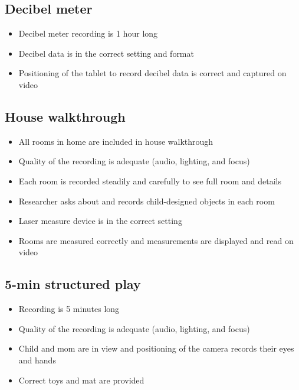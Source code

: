 \documentclass[
  12pt,
]{book}
\providecommand{\tightlist}{%
  \setlength{\itemsep}{0pt}\setlength{\parskip}{0pt}}
\begin{document}
\hypertarget{decibel-meter-1}{%
\subsection{Decibel meter}\label{decibel-meter-1}}

\begin{itemize}
\tightlist
\item
  Decibel meter recording is 1 hour long
\item
  Decibel data is in the correct setting and format
\item
  Positioning of the tablet to record decibel data is correct and captured on video
\end{itemize}

\hypertarget{house-walkthrough}{%
\subsection{House walkthrough}\label{house-walkthrough}}

\begin{itemize}
\tightlist
\item
  All rooms in home are included in house walkthrough
\item
  Quality of the recording is adequate (audio, lighting, and focus)
\item
  Each room is recorded steadily and carefully to see full room and details
\item
  Researcher asks about and records child-designed objects in each room
\item
  Laser measure device is in the correct setting
\item
  Rooms are measured correctly and measurements are displayed and read on video
\end{itemize}

\hypertarget{min-structured-play}{%
\subsection{5-min structured play}\label{min-structured-play}}

\begin{itemize}
\tightlist
\item
  Recording is 5 minutes long
\item
  Quality of the recording is adequate (audio, lighting, and focus)
\item
  Child and mom are in view and positioning of the camera records their eyes and hands
\item
  Correct toys and mat are provided
\end{itemize}
\end{document}
